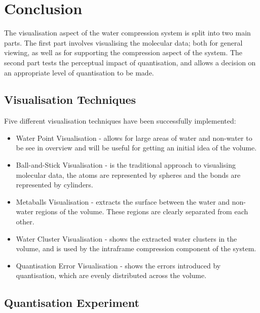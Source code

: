 \chapter{Conclusion}
\label{cha:conclusion}

The visualisation aspect of the water compression system is split into two main
parts. The first part involves visualising the molecular data; both for general
viewing, as well as for supporting the compression aspect of the system. The
second part tests the perceptual impact of quantisation, and allows a decision
on an appropriate level of quantisation to be made.

\section{Visualisation Techniques}
\label{sec:conclusion_visualisation}

Five different visualisation techniques have been successfully implemented:
\begin{itemize}

  \item Water Point Visualisation - allows for large areas of water and
  non-water to be see in overview and will be useful for getting an initial
  idea of the volume.

  \item Ball-and-Stick Visualisation - is the traditional approach to
  visualising molecular data, the atoms are represented by spheres and the
  bonds are represented by cylinders.

  \item Metaballs Visualisation - extracts the surface between the water and
  non-water regions of the volume. These regions are clearly separated from
  each other.

  \item Water Cluster Visualisation - shows the extracted water clusters in the
  volume, and is used by the intraframe compression component of the system.

  \item Quantisation Error Visualisation - shows the errors introduced by
  quantisation, which are evenly distributed across the volume.

\end{itemize}


\section{Quantisation Experiment}
\label{sec:conclustion_experiment}

